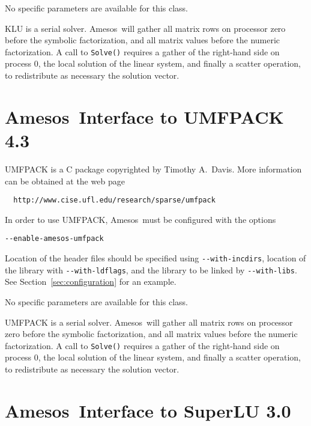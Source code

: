 \documentclass[11pt]{SANDreport}
\newcommand{\amesos}{{\sc Amesos}}
\begin{document}
\smallskip

No specific parameters are available for this class.

\smallskip

KLU is a serial solver. \amesos\ will gather all matrix rows on processor
zero before the symbolic factorization, and all matrix values before the
numeric factorization. A call to \verb!Solve()! requires a gather
of the right-hand side on process 0, the local solution of the linear
system, and finally a scatter operation, to redistribute as necessary the
solution vector.

\section{\amesos\ Interface to UMFPACK 4.3}
\label{sec:umfpack}

UMFPACK is a C package copyrighted by Timothy A.~Davis. More information
can be obtained at the web page
\begin{verbatim}
  http://www.cise.ufl.edu/research/sparse/umfpack
\end{verbatim}

In order to use UMFPACK, \amesos\ must be configured with the options
\begin{verbatim}
--enable-amesos-umfpack 
\end{verbatim}
Location of the header files should be specified using \verb!--with-incdirs!,
location of the library with \verb!--with-ldflags!, and the library
to be linked by \verb!--with-libs!. See Section~\ref{sec:configuration} for an
example.

\smallskip

No specific parameters are available for this class.

\smallskip

UMFPACK is a serial solver. \amesos\ will gather all matrix rows on processor
zero before the symbolic factorization, and all matrix values before the
numeric factorization. A call to \verb!Solve()! requires a gather
of the right-hand side on process 0, the local solution of the linear
system, and finally a scatter operation, to redistribute as necessary the
solution vector.

\section{\amesos\ Interface to SuperLU 3.0}
\label{sec:superlu}
\end{document}
